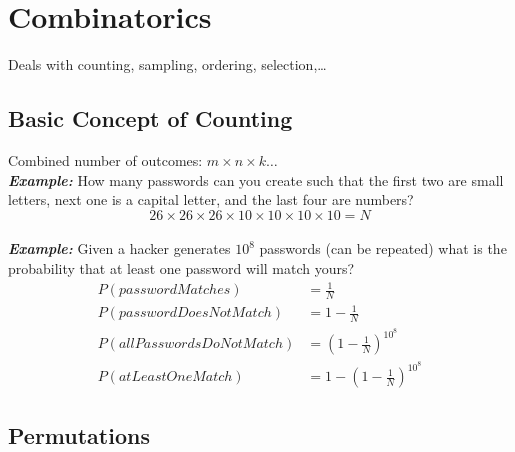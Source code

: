 \documentclass[12pt]{article}
\begin{document}
    \section{Combinatorics}

    Deals with counting, sampling, ordering, selection,\dots

    \subsection{Basic Concept of Counting}

    Combined number of outcomes: $m \times n \times k\dots$\\[\baselineskip]
    \textit{\textbf{Example:}} How many passwords can you create such 
    that the first two are small letters, next one is a capital letter, 
    and the last four are numbers?\\
    $$26\times 26\times 26\times 10\times 10\times 10\times 10 = N$$\\
    \textit{\textbf{Example:}} Given a hacker generates $10^8$ passwords (can be 
    repeated) what is the probability that at least one password will match yours?
    \begin{align*}
        P(passwordMatches) &= \frac{1}{N}\\
        P(passwordDoesNotMatch) &= 1 - \frac{1}{N}\\
        P(allPasswordsDoNotMatch) &= \left(1-\frac{1}{N}\right)^{10^8}\\
        P(atLeastOneMatch) &= 1 - \left(1-\frac{1}{N}\right)^{10^8}
    \end{align*}

    \subsection{Permutations}
\end{document}
